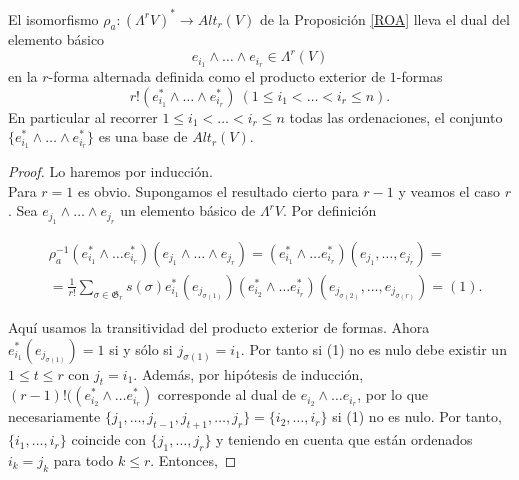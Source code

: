 \documentclass[../VD.tex]{subfiles}
\begin{document}
\begin{proposition}\label{prop:base-alt}
El isomorfismo \( \rho_a\colon(\Lambda^rV)^*\to Alt_r(V)  \) de la Proposición \ref{ROA}
lleva el dual del elemento básico 
\[ e_{i_1}\wedge\ldots \wedge e_{i_r}\in \Lambda^r(V)
\]
en la \(r\)-forma alternada definida como el producto exterior de $1$-formas 
\[r!(e_{i_1}^*\wedge\ldots\wedge e_{i_r}^*) \ (1\leq i_1< \ldots<i_r\leq n).
\] 
En particular al recorrer  \( 1\leq i_1< \ldots<i_r\leq n  \) todas las
ordenaciones, el conjunto \( \{e_{i_1}^*\wedge\ldots\wedge e_{i_r}^*\}\) es
una base de \( Alt_r(V) \).
\end{proposition}

\begin{proof}
Lo haremos por inducción.\\
Para \(r=1\) es obvio. Supongamos el resultado cierto para \(r-1\) y veamos el caso \(r\). Sea $e_{j_1} \wedge \ldots \wedge e_{j_r}$ un elemento básico de \(\Lambda^r V\). Por definición

\begin{equation}
 \label{proof:prop-alt}
\begin{aligned}
&\rho_a^{-1}(e_{i_1}^*\wedge\ldots e_{i_r}^*)(e_{j_1}\wedge\ldots\wedge e_{j_r}) =(e_{i_1}^*\wedge\ldots e_{i_r}^*)(e_{j_1},\ldots, e_{j_r})=\\
&=\frac{1}{r!}\sum_{\sigma\in \mathfrak{G}_r} s(\sigma)e_{i_1}^*(e_{j_{\sigma(1)}})(e_{i_2}^*\wedge\ldots e_{i_r}^*)(e_{j_{\sigma(2)}},\ldots, e_{j_{\sigma(r)}}) = (1).
\end{aligned}
\end{equation}

Aquí usamos la transitividad del producto exterior de formas. Ahora \( e_{i_1}^*(e_{j_{\sigma(1)}})=1 \) si y sólo si  \( j_{\sigma(1)}=i_1 \).
Por tanto si (1) no es nulo debe existir un \( 1\leq t\leq r \) con \( j_t=i_1 \). Además, por hipótesis de inducción, \( (r-1)!((e_{i_2}^*\wedge\ldots e_{i_r}^*) \) corresponde al dual de \( e_{i_2}\wedge\ldots e_{i_r} \), por lo que necesariamente \( \{j_1,\ldots,j_{t-1},j_{t+1},\ldots,j_r\}=\{i_2,\ldots,i_r\} \) si (1) no es nulo. Por tanto,  \(\{i_1,\ldots, i_r\}\) coincide con  \(\{j_1,\ldots, j_r\}\) y teniendo en cuenta que están ordenados \(i_k = j_k\) para todo \(k\leq r\). Entonces,   


\end{proof}
\end{document}
